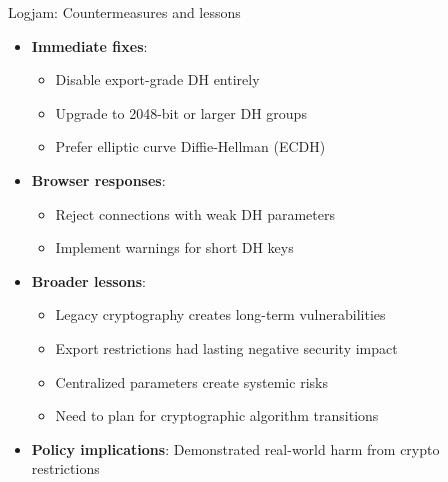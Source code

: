 \documentclass[aspectratio=169, lualatex, handout]{beamer}
\begin{document}
\begin{frame}{Logjam: Countermeasures and lessons}
	\begin{itemize}
		\item \textbf{Immediate fixes}:
		      \begin{itemize}
			      \item Disable export-grade DH entirely
			      \item Upgrade to 2048-bit or larger DH groups
			      \item Prefer elliptic curve Diffie-Hellman (ECDH)
		      \end{itemize}
		\item \textbf{Browser responses}:
		      \begin{itemize}
			      \item Reject connections with weak DH parameters
			      \item Implement warnings for short DH keys
		      \end{itemize}
		\item \textbf{Broader lessons}:
		      \begin{itemize}
			      \item Legacy cryptography creates long-term vulnerabilities
			      \item Export restrictions had lasting negative security impact
			      \item Centralized parameters create systemic risks
			      \item Need to plan for cryptographic algorithm transitions
		      \end{itemize}
		\item \textbf{Policy implications}: Demonstrated real-world harm from crypto restrictions
	\end{itemize}
\end{frame}
\end{document}

